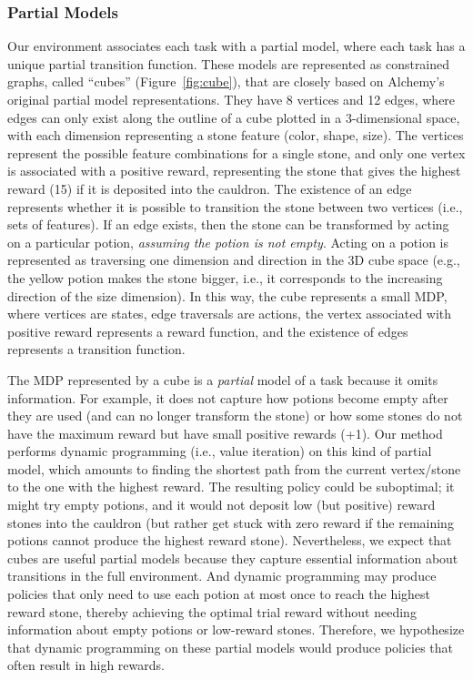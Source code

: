 \documentclass[sigconf]{aamas}
\begin{document}
\subsubsection{Partial Models} Our environment associates each task with a partial model, where each task has a unique partial transition function. These models are represented as constrained graphs, called ``cubes'' (Figure~\ref{fig:cube}), that are closely based on Alchemy's original partial model representations. They have 8 vertices and 12 edges, where edges can only exist along the outline of a cube plotted in a 3-dimensional space, with each dimension representing a stone feature (color, shape, size).
The vertices represent the possible feature combinations for a single stone, and only one vertex is associated with a positive reward, representing the stone that gives the highest reward (15) if it is deposited into the cauldron. The existence of an edge represents whether it is possible to transition the stone between two vertices (i.e., sets of features). If an edge exists, then the stone can be transformed by acting on a particular potion, \textit{assuming the potion is not empty}. Acting on a potion is represented as traversing one dimension and direction in the 3D cube space (e.g., the yellow potion makes the stone bigger, i.e.,  it corresponds to the increasing direction of the size dimension). In this way, the cube represents a small MDP, where vertices are states, edge traversals are actions, the vertex associated with positive reward represents a reward function, and the existence of edges represents a transition function.

The MDP represented by a cube is a \textit{partial} model of a task because it omits information. For example, it does not capture how potions become empty after they are used (and can no longer transform the stone) or how some stones do not have the maximum reward but have small positive rewards (+1). Our method performs dynamic programming (i.e., value iteration) on this kind of partial model, which amounts to finding the shortest path from the current vertex/stone to the one with the highest reward. The resulting policy could be suboptimal; it might try empty potions, and it would not deposit low (but positive) reward stones into the cauldron (but rather get stuck with zero reward if the remaining potions cannot produce the highest reward stone).
Nevertheless, we expect that cubes are useful partial models because they capture essential information about transitions in the full environment. And dynamic programming may produce policies that only need to use each potion at most once to reach the highest reward stone, thereby achieving the optimal trial reward without needing information about empty potions or low-reward stones.
Therefore, we hypothesize that dynamic programming on these partial models would produce policies that often result in high rewards.
\end{document}
